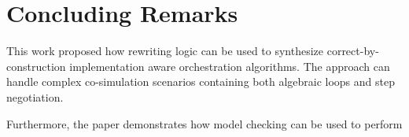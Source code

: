 \section{Concluding Remarks}\label{sc:summary}
This work proposed how rewriting logic can be used to synthesize correct-by-construction implementation aware orchestration algorithms.
The approach can handle complex co-simulation scenarios containing both algebraic loops and step negotiation.

Furthermore, the paper demonstrates how model checking can be used to perform 
